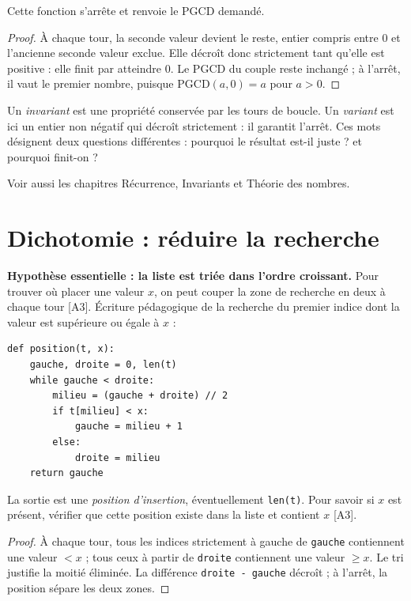 \documentclass[11pt]{article}
\begin{document}
\begin{proposition}
Cette fonction s'arrête et renvoie le PGCD demandé.
\end{proposition}
\begin{proof}
À chaque tour, la seconde valeur devient le reste, entier compris entre $0$ et l'ancienne seconde valeur exclue. Elle décroît donc strictement tant qu'elle est positive : elle finit par atteindre $0$. Le PGCD du couple reste inchangé ; à l'arrêt, il vaut le premier nombre, puisque $\mathrm{PGCD}(a,0)=a$ pour $a>0$.
\end{proof}

\begin{retenir}
Un \emph{invariant} est une propriété conservée par les tours de boucle. Un \emph{variant} est ici un entier non négatif qui décroît strictement : il garantit l'arrêt. Ces mots désignent deux questions différentes : \og pourquoi le résultat est-il juste ?\fg{} et \og pourquoi finit-on ?\fg{}
\end{retenir}
Voir aussi les chapitres Récurrence, Invariants et Théorie des nombres.

\section{Dichotomie : réduire la recherche}\label{sec:dichotomie}
\textbf{Hypothèse essentielle : la liste est triée dans l'ordre croissant.} Pour trouver où placer une valeur $x$, on peut couper la zone de recherche en deux à chaque tour [A3]. Écriture pédagogique de la recherche du premier indice dont la valeur est supérieure ou égale à $x$ :
\begin{verbatim}
def position(t, x):
    gauche, droite = 0, len(t)
    while gauche < droite:
        milieu = (gauche + droite) // 2
        if t[milieu] < x:
            gauche = milieu + 1
        else:
            droite = milieu
    return gauche
\end{verbatim}
La sortie est une \emph{position d'insertion}, éventuellement \texttt{len(t)}. Pour savoir si $x$ est présent, vérifier que cette position existe dans la liste et contient $x$ [A3].

\begin{proof}
À chaque tour, tous les indices strictement à gauche de \texttt{gauche} contiennent une valeur $<x$ ; tous ceux à partir de \texttt{droite} contiennent une valeur $\ge x$. Le tri justifie la moitié éliminée. La différence \texttt{droite - gauche} décroît ; à l'arrêt, la position sépare les deux zones.
\end{proof}
\end{document}
